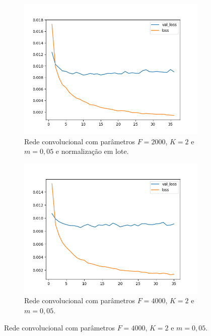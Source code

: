 \begin{figure}[H]
\begin{subfigure}{.5\textwidth}
  \label{fig:cnn-2000-k-2-m-005}
\end{subfigure}
\begin{subfigure}{.5\textwidth}
  \centering
  \caption{Rede convolucional com parâmetros $F = 2000$, $K = 2$ e $m = 0,05$ e normalização em lote.}
  \includegraphics[width=.8\linewidth]{figuras/ape-ajustes-hiper-parametros/cnn-with-bn-2000-k-2-m-005.png}
  
  \label{fig:cnn-2000-k-2-m-005-normalizacao-em-lote}
\end{subfigure}
\begin{subfigure}{.5\textwidth}
  \centering
  \caption{Rede convolucional com parâmetros $F = 4000$, $K = 2$ e $m = 0,05$.}
  \includegraphics[width=.8\linewidth]{figuras/ape-ajustes-hiper-parametros/cnn-4000-k-2-m-005.png}
  

\end{subfigure}
\end{figure}
